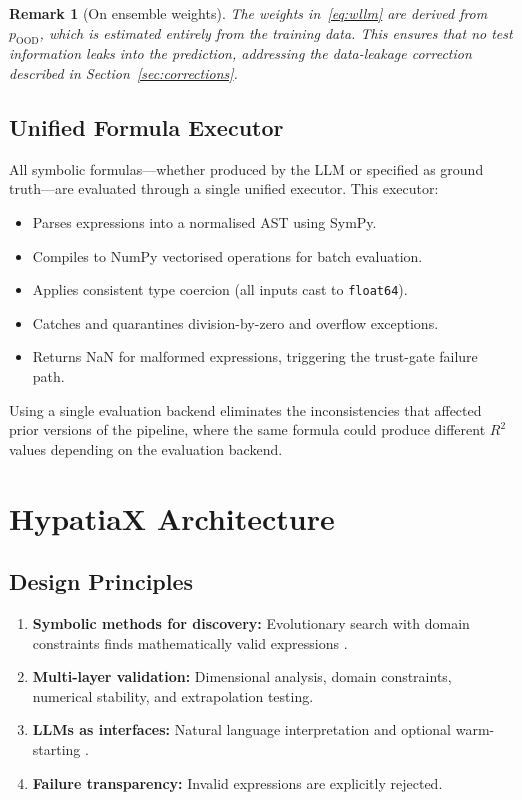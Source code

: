 \documentclass[twoside,11pt]{article}
\newcommand{\Rsq}{R^{2}}
\newtheorem{remark}[theorem]{Remark}
\begin{document}
\begin{remark}[On ensemble weights]
The weights in~\eqref{eq:wllm} are derived from $p_{\mathrm{OOD}}$, which is
estimated entirely from the training data.  This ensures that no test information
leaks into the prediction, addressing the data-leakage correction described in
Section~\ref{sec:corrections}.
\end{remark}

\subsection{Unified Formula Executor}
\label{sec:executor}

All symbolic formulas---whether produced by the LLM or specified as ground truth---are
evaluated through a single unified executor.  This executor:
\begin{itemize}
  \item Parses expressions into a normalised AST using SymPy.
  \item Compiles to NumPy vectorised operations for batch evaluation.
  \item Applies consistent type coercion (all inputs cast to \texttt{float64}).
  \item Catches and quarantines division-by-zero and overflow exceptions.
  \item Returns NaN for malformed expressions, triggering the trust-gate failure path.
\end{itemize}
Using a single evaluation backend eliminates the inconsistencies that affected
prior versions of the pipeline, where the same formula could produce different
$\Rsq$ values depending on the evaluation backend.

\section{HypatiaX Architecture}
\label{sec:architecture}

\subsection{Design Principles}
\label{sec:arch_principles}

\begin{enumerate}
\item \textbf{Symbolic methods for discovery:} Evolutionary search with domain
  constraints finds mathematically valid expressions \citep{cranmer2023pysr}.
\item \textbf{Multi-layer validation:} Dimensional analysis, domain constraints,
  numerical stability, and extrapolation testing.
\item \textbf{LLMs as interfaces:} Natural language interpretation and optional
  warm-starting \citep{kambhampati2024llms}.
\item \textbf{Failure transparency:} Invalid expressions are explicitly rejected.
\end{enumerate}
\end{document}
